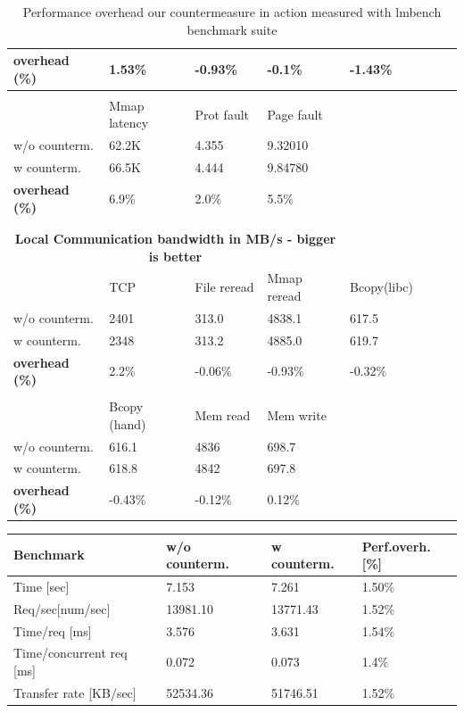 \begin{center}
\begin{table}
\begin{tabular}{|l|l|l|l|l|l|l|l|}
\hline
\bf{overhead (\%)}  & 1.53\%            & -0.93\%          &  -0.1\%              & -1.43\%              \\ \hline
\multicolumn{3}{|c|}{\bf{  }} \\ \hline
		      & Mmap latency & Prot fault &  Page fault  & \\ \hline
w/o counterm. &  62.2K             & 4.355       & 9.32010 &\\
w counterm.    & 66.5K              & 4.444       & 9.84780 &\\
\hline
\bf{overhead (\%)} & 6.9\%               &  2.0\%     &  5.5\% & \\ \hline
\\
\\
\hline


\multicolumn{4}{|c|}{\bf{Local Communication bandwidth in MB/s - bigger is better}} & \\ \hline
	                          & TCP  &  File reread   &  Mmap reread & Bcopy(libc)   \\ \hline
w/o counterm.            & 2401 & 313.0            & 4838.1             &  617.5           \\
w counterm.               & 2348 & 313.2            & 4885.0             & 619.7            \\
\hline
\bf{overhead (\%)}     & 2.2\% & -0.06\%         & -0.93\%           &  -0.32\%         \\ \hline
\multicolumn{3}{|c|}{\bf{  }} \\ \hline
				& Bcopy (hand) & Mem read  &  Mem write &\\ \hline
w/o counterm. 		& 616.1              & 4836          &  698.7 &\\
w counterm.		& 618.8              & 4842          & 697.8  &\\
\hline				
\bf{overhead (\%)}  	&  -0.43\%         &  -0.12\%    & 0.12\% & \\ \hline
\end{tabular}
\caption{Performance overhead our countermeasure in action measured with lmbench benchmark suite}
\label{microbench}
\end{table}


\vspace{3\baselineskip}
\begin{table}
\begin{tabular}{|l|l|l|l|}
\hline
\bf{Benchmark} & \bf{w/o counterm.} & \bf{w counterm.} & \bf{Perf.overh.[\%]} \\
\hline
Time [sec]				 &     7.153    &    7.261  &  1.50\% \\
\hline
Req/sec[num/sec]  &  13981.10 & 13771.43  & 1.52\% \\
\hline
Time/req [ms]    & 3.576 & 3.631  &  1.54\% \\
\hline
Time/concurrent req [ms] & 0.072 & 0.073  & 1.4\% \\
\hline
Transfer rate [KB/sec]        & 52534.36 & 51746.51   & 1.52\%
\\
\hline
\end{tabular}


\end{table}
\end{center}
